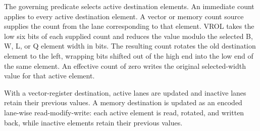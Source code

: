 The governing predicate selects active destination elements. An immediate
count applies to every active destination element. A vector or
memory count source supplies the count from the lane corresponding to that
element. VROL takes the low six bits of each supplied count and reduces the
value modulo the selected B, W, L, or Q element width in bits. The resulting
count rotates the old destination element to the left, wrapping bits shifted
out of the high end into the low end of the same element. An effective count of
zero writes the original selected-width value for that active element.

With a vector-register destination, active lanes are updated and inactive lanes
retain their previous values. A memory destination is updated as an encoded
lane-wise read-modify-write: each active element is read, rotated, and written
back, while inactive elements retain their previous values.
